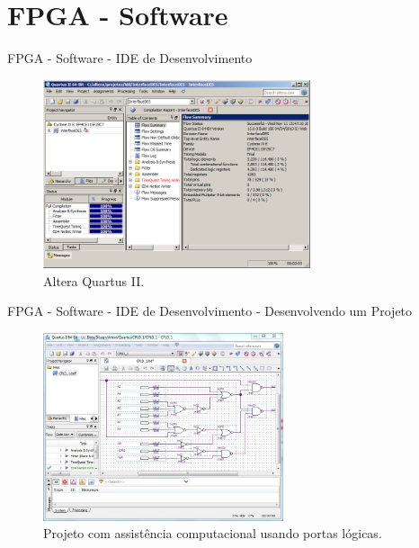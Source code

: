 \documentclass[aspectratio=169]{beamer}
\begin{document}
\section{FPGA - Software}
	\begin{frame}{FPGA - Software - IDE de Desenvolvimento}
		\begin{figure}[p]
			\centering
			\includegraphics[width=0.7\textwidth]{img/fpga/altera.png}
			\caption{Altera Quartus II.}
			\label{fig:alteraquartus}
		\end{figure}
	\end{frame}
	
	\begin{frame}{FPGA - Software - IDE de Desenvolvimento - Desenvolvendo um Projeto}
		\begin{figure}[p]
			\centering
			\includegraphics[width=0.63\textwidth]{img/fpga/software_quartus_portas.jpg}
			\caption{Projeto com assistência computacional usando portas lógicas.}
			\label{fig:alteraquartus_portas1}
		\end{figure}
	\end{frame}
	
\end{document}
